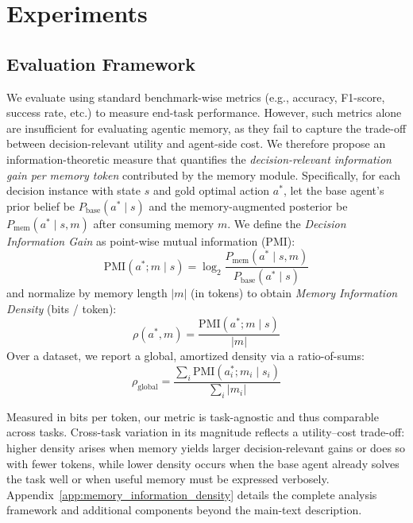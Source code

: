 
\section{Experiments}
\label{sec:experiments}
\subsection{Evaluation Framework}
\label{sec:4.1}
We evaluate \plugmem using standard benchmark-wise metrics (e.g., accuracy, F1-score, success rate, etc.) to measure end-task performance.
However, such metrics alone are insufficient for evaluating agentic memory, as they fail to capture the trade-off between decision-relevant utility and agent-side cost.
We therefore propose an information-theoretic measure that quantifies the \emph{decision-relevant information gain per memory token} contributed by the memory module.
Specifically, for each decision instance with state $s$ and gold optimal action $a^{*}$, let the base agent’s prior belief be $P_{\text{base}}(a^{*}\mid s)$ and the memory-augmented posterior be $P_{\text{mem}}(a^{*}\mid s,m)$ after consuming memory $m$.
We define the \emph{Decision Information Gain} as point-wise mutual information (PMI):
\begin{equation}
\label{eq:pmi}
\mathrm{PMI}(a^{*}; m \mid s)=\log_{2}\frac{P_{\text{mem}}(a^{*}\mid s,m)}{P_{\text{base}}(a^{*}\mid s)}
\end{equation}
%
and normalize by memory length $|m|$ (in tokens) to obtain \emph{Memory Information Density} (bits / token):
\begin{equation}
\label{eq:density_single}
\rho(a^{*},m)=\frac{\mathrm{PMI}(a^{*}; m \mid s)}{|m|} %
\end{equation}
%
Over a dataset, we report a global, amortized density via a ratio-of-sums:
\begin{equation}
\label{eq:density_global}
\rho_{\text{global}}=\frac{\sum_{i}\mathrm{PMI}(a^{*}_{i}; m_{i}\mid s_{i})}{\sum_{i}|m_{i}|} %
\end{equation}

Measured in bits per token, our metric is task-agnostic and thus comparable across tasks. Cross-task variation in its magnitude reflects a utility–cost trade-off: higher density arises when memory yields larger decision-relevant gains or does so with fewer tokens, while lower density occurs when the base agent already solves the task well or when useful memory must be expressed verbosely. Appendix~\ref{app:memory_information_density} details the complete analysis framework and additional components beyond the main-text description.

